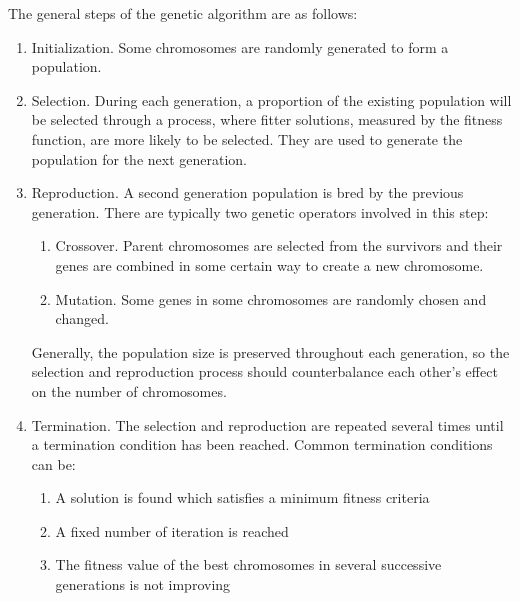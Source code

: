 \documentclass{article}
\begin{document}
The general steps of the genetic algorithm are as follows:
\begin{enumerate}
    \item Initialization. Some chromosomes are randomly generated to form a population.
    \item Selection. During each generation, a proportion of the existing population will be selected
        through a process, where fitter solutions, measured by the fitness function, are more likely to be selected. They are used to generate the population for the next generation.
    \item Reproduction. A second generation population is bred by the previous generation. There are typically
        two genetic operators involved in this step:
        \begin{enumerate}
            \item Crossover. Parent chromosomes are selected from the survivors and their genes are combined in some certain way
                to create a new chromosome.
            \item Mutation. Some genes in some chromosomes are randomly chosen and changed.
        \end{enumerate}
        Generally, the population size is preserved throughout each generation,
        so the selection and reproduction process should counterbalance each other's effect on the number of chromosomes.
    \item Termination. The selection and reproduction are repeated several times until a termination condition has been reached.
        Common termination conditions can be:
        \begin{enumerate}
            \item A solution is found which satisfies a minimum fitness criteria
            \item A fixed number of iteration is reached
            \item The fitness value of the best chromosomes in several successive generations is not improving
        \end{enumerate}
\end{enumerate}
\end{document}
